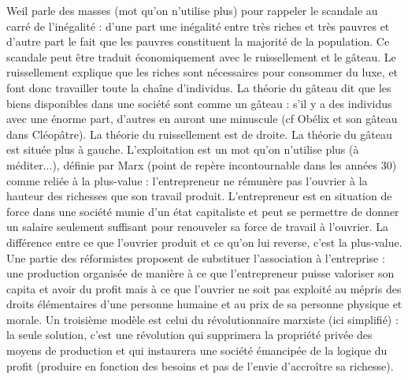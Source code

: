 \documentclass[a4paper,12pt]{book}
\begin{document}
\par Weil parle des masses (mot qu'on n'utilise plus) pour rappeler le scandale au carré de l'inégalité : d'une part une inégalité entre très riches et très pauvres et d'autre part le fait que les pauvres constituent la majorité de la population. Ce scandale peut être traduit économiquement avec le ruissellement et le gâteau. Le ruissellement explique que les riches sont nécessaires pour consommer du luxe, et font donc travailler toute la chaîne d'individus. La théorie du gâteau dit que les biens disponibles dans une société sont comme un gâteau : s'il y a des individus avec une énorme part, d'autres en auront une minuscule (cf Obélix et son gâteau dans Cléopâtre). La théorie du ruissellement est de droite. La théorie du gâteau est située plus à gauche. L'exploitation est un mot qu'on n'utilise plus (à méditer...), définie par Marx (point de repère incontournable dans les années 30) comme reliée à la plus-value : l'entrepreneur ne rémunère pas l'ouvrier à la hauteur des richesses que son travail produit. L'entrepreneur est en situation de force dans une société munie d'un état capitaliste et peut se permettre de donner un salaire seulement suffisant pour renouveler sa force de travail à l'ouvrier. La différence entre ce que l'ouvrier produit et ce qu'on lui reverse, c'est la plus-value. Une partie des réformistes proposent de substituer l'association à l'entreprise : une production organisée de manière à ce que l'entrepreneur puisse valoriser son capita et avoir du profit mais à ce que l'ouvrier ne soit pas exploité au mépris des droits élémentaires d'une personne humaine et au prix de sa personne physique et morale. Un troisième modèle est celui du révolutionnaire marxiste (ici simplifié) : la seule solution, c'est une révolution qui supprimera la propriété privée des moyens de production et qui instaurera une société émancipée de la logique du profit (produire en fonction des besoins et pas de l'envie d'accroître sa richesse).
\end{document}
